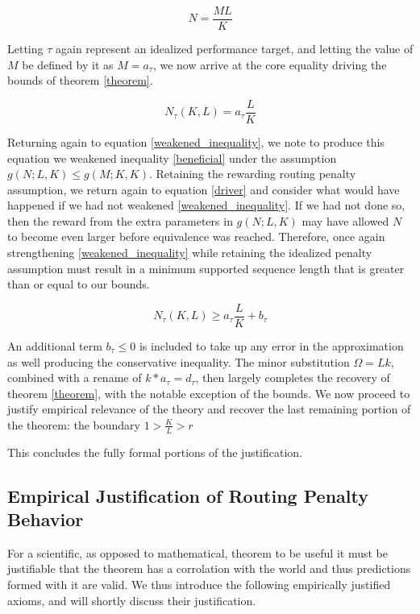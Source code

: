 \documentclass[11pt]{article}
\begin{document}
\begin{equation}
\label{boundary}
N = \frac{ML}{K}
\end{equation}

Letting $\tau$ again represent an idealized performance target, and letting the value of $M$ be defined by it as $M=a_\tau$, we  now arrive at the core equality driving the bounds of theorem \ref{theorem}.

\begin{equation}
\label{driver}
N_\tau(K, L) =  a_\tau \frac{L}{K}
\end{equation}

Returning again to equation \ref{weakened_inequality}, we note to produce this equation we weakened inequality \ref{beneficial} under the assumption $g(N;L,K) \leq g(M;K,K)$. Retaining the rewarding routing penalty assumption, we return again to equation \ref{driver} and consider what would have happened if we had not weakened \ref{weakened_inequality}. If we had not done so, then the reward from the extra parameters in $g(N;L,K)$ may have allowed $N$ to become even larger before equivalence was reached. Therefore, once again strengthening \ref{weakened_inequality} while retaining the idealized penalty assumption must result in a minimum supported sequence length that is greater than or equal to our bounds.

\begin{equation}
\label{bounding_condition}
N_\tau(K, L) \geq  a_\tau \frac{L}{K} + b_\tau
\end{equation}

An additional term $b_\tau \leq 0$ is included to take up any error in the approximation as well producing the conservative inequality. The minor substitution $\Omega = Lk$, combined with a rename of $k*a_\tau=d_\tau$, then largely completes the recovery of theorem \ref{theorem}, with the notable exception of the bounds. We now proceed to justify empirical relevance of the theory and recover the last remaining portion of the theorem: the boundary $1>\frac{K}{L}>r$

This concludes the fully formal portions of the justification.

\subsection{Empirical Justification of Routing Penalty Behavior}

For a scientific, as opposed to mathematical, theorem to be useful it must be justifiable that the theorem has a corrolation with the world and thus predictions formed with it are valid. We thus introduce the following  empirically justified axioms, and will shortly discuss their justification.
\end{document}
